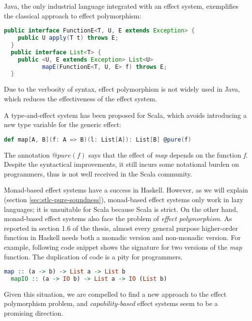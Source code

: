 Java, the only industrial language integrated with an effect system,
exemplifies the classical approach to effect polymorphism:

\begin{lstlisting}[language=Java]
  public interface FunctionE<T, U, E extends Exception> {
    public U apply(T t) throws E;
  }
  public interface List<T> {
    public <U, E extends Exception> List<U>
           mapE(FunctionE<T, U, E> f) throws E;
  }
\end{lstlisting}

Due to the verbosity of syntax, effect polymorphism is not widely used
in Java, which reduces the effectiveness of the effect system.

A type-and-effect system has been proposed for
Scala\cite{lukas2014effect}, which avoids introducing a new type
variable for the generic effect:

\begin{lstlisting}[language=Scala]
def map[A, B](f: A => B)(l: List[A]): List[B] @pure(f)
\end{lstlisting}

The annotation $@pure(f)$ says that the effect of \emph{map} depends
on the function \emph{f}. Despite the syntactical improvements, it
still incurs some notational burden on programmers, thus is not well
received in the Scala community.

Monad-based effect systems have a success in Haskell. However, as we
will explain (section \ref{sec:stlc-pure-soundness}), monad-based
effect systems only work in lazy languages; it is unsuitable for Scala
because Scala is strict. On the other hand, monad-based effect systems
also face the problem of \emph{effect polymorphism}. As reported in
section 1.6 of the thesis\cite{lippmeier2009type}, almost every
general purpose higher-order function in Haskell needs both a monadic
version and non-monadic version. For example, following code snippet
shows the signature for two versions of the \emph{map} function. The
duplication of code is a pity for programmers.

\begin{lstlisting}[language=Haskell]
  map :: (a -> b) -> List a -> List b
  mapIO :: (a -> IO b) -> List a -> IO (List b)
\end{lstlisting}

Given this situation, we are compelled to find a new approach to the
effect polymorphism problem, and \emph{capability-based} effect
systems seem to be a promising direction.

